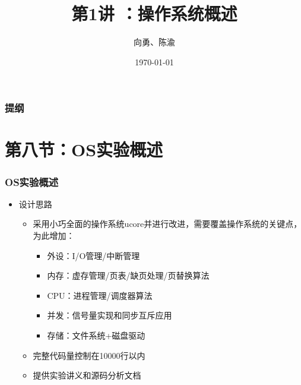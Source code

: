 \documentclass[UTF8]{ctexbeamer}
\title[第1讲]{第1讲 ：操作系统概述} %
\author{向勇、陈渝} %
\institute[清华大学] %
{
清华大学计算机系 \\ %
\medskip
\textit{xyong,yuchen@tsinghua.edu.cn} %
}
\date{\today} %
\begin{document}
\begin{frame}
\titlepage %
\end{frame}

\begin{frame}
\frametitle{提纲} %
\tableofcontents %
\end{frame}


\section{第八节：OS实验概述} %


\begin{frame}

\frametitle{OS实验概述}

\begin{itemize}
\item 设计思路
    \begin{itemize}
    \item 采用小巧全面的操作系统ucore并进行改进，需要覆盖操作系统的关键点，为此增加：
    \begin{itemize}
        \item 外设：I/O管理/中断管理
        \item 内存：虚存管理/页表/缺页处理/页替换算法
        \item CPU：进程管理/调度器算法
        \item 并发：信号量实现和同步互斥应用
        \item 存储：文件系统+磁盘驱动
    \end{itemize}
    \item 完整代码量控制在10000行以内
    \item 提供实验讲义和源码分析文档
    \end{itemize}
\end{itemize}

\end{frame}
\end{document}

